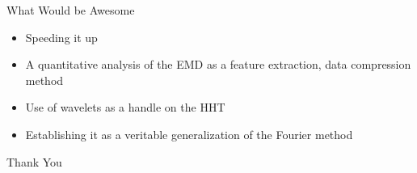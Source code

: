 \documentclass[xcolor=dvipsnames]{beamer}
\begin{document}
\begin{frame}{What Would be Awesome}
\begin{itemize}
\item Speeding it up
\item A quantitative analysis of the EMD as a feature extraction, data compression method
\item Use of wavelets as a handle on the HHT
\item Establishing it as a veritable generalization of the Fourier method
\end{itemize}
\end{frame}
%
\begin{frame}
Thank You
\end{frame}
\end{document}
